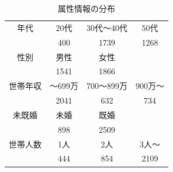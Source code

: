 \documentclass[11pt]{jsarticle}
\begin{document}
\begin{table}[htbp]
 \centering
  \caption{属性情報の分布}
\begin{center}
 \begin{tabular}{c|ccc} \hline
   年代 & 20代 & 30代〜40代 & 50代 \\
    & 400 & 1739 & 1268 \\ \hline
   性別 & 男性 & 女性 &  \\
    & 1541 & 1866 &  \\ \hline
   世帯年収 & 〜699万 & 700〜899万 & 900万〜 \\
    & 2041 & 632 & 734 \\ \hline
   未既婚 & 未婚 & 既婚 &  \\
    & 898 & 2509 &  \\ \hline
   世帯人数 & 1人 & 2人 & 3人〜 \\
    & 444 & 854 & 2109 \\
   \end{tabular}
   \label{tab:consumer_distribution}
  \end{center}
 \end{table}
\end{document}
